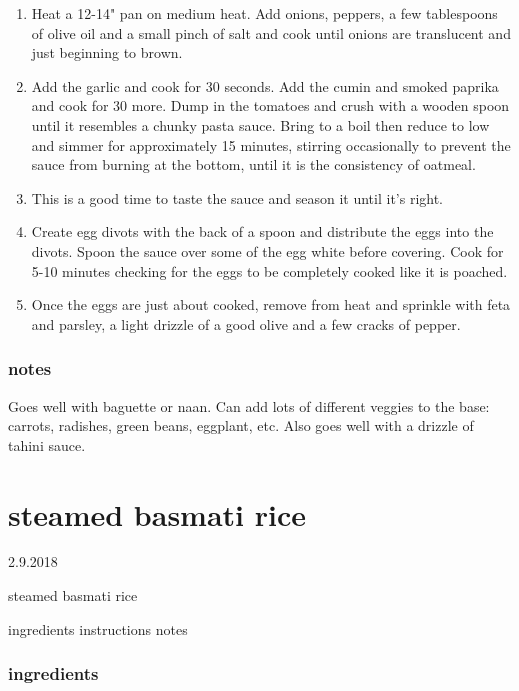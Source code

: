 \documentclass[]{book}
\providecommand{\tightlist}{%
  \setlength{\itemsep}{0pt}\setlength{\parskip}{0pt}}
\begin{document}
\begin{enumerate}
\def\labelenumi{\arabic{enumi}.}
\tightlist
\item
  Heat a 12-14" pan on medium heat. Add onions, peppers, a few tablespoons of olive oil and a small pinch of salt and
  cook until onions are translucent and just beginning to brown.
\item
  Add the garlic and cook for 30 seconds. Add the cumin and smoked paprika and cook for 30 more. Dump in the tomatoes
  and crush with a wooden spoon until it resembles a chunky pasta sauce. Bring to a boil then reduce to low and simmer
  for approximately 15 minutes, stirring occasionally to prevent the sauce from burning at the bottom, until it is the
  consistency of oatmeal.
\item
  This is a good time to taste the sauce and season it until it's right.
\item
  Create egg divots with the back of a spoon and distribute the eggs into the divots. Spoon the sauce over some of the
  egg white before covering. Cook for 5-10 minutes checking for the eggs to be completely cooked like it is poached.
\item
  Once the eggs are just about cooked, remove from heat and sprinkle with feta and parsley, a light drizzle of a good
  olive and a few cracks of pepper.
\end{enumerate}

\hypertarget{notes-16}{%
\subsection{notes}\label{notes-16}}

Goes well with baguette or naan. Can add lots of different veggies to the base: carrots, radishes, green beans,
eggplant, etc. Also goes well with a drizzle of tahini sauce.

\hypertarget{steamed-basmati-rice}{%
\chapter{steamed basmati rice}\label{steamed-basmati-rice}}

2.9.2018

steamed basmati rice

ingredients \textbar{}
instructions \textbar{}
notes

\hypertarget{ingredients-17}{%
\subsection{ingredients}\label{ingredients-17}}
\end{document}
